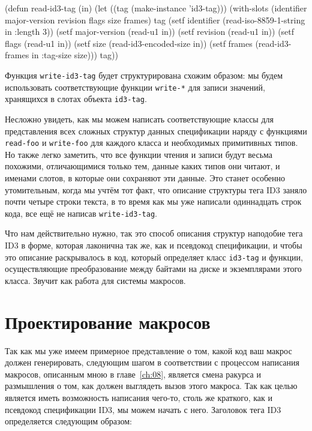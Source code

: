\begin{myverb}
(defun read-id3-tag (in)
  (let ((tag (make-instance 'id3-tag)))
    (with-slots (identifier major-version revision flags size frames) tag
      (setf identifier    (read-iso-8859-1-string in :length 3))
      (setf major-version (read-u1 in))
      (setf revision      (read-u1 in))
      (setf flags         (read-u1 in))
      (setf size          (read-id3-encoded-size in))
      (setf frames        (read-id3-frames in :tag-size size)))
    tag))
\end{myverb}

Функция \lstinline{write-id3-tag} будет структурирована схожим образом: мы будем использовать
соответствующие функции \lstinline{write-*} для записи значений, хранящихся в слотах объекта
\lstinline{id3-tag}.

Несложно увидеть, как мы можем написать соответствующие классы для представления всех
сложных структур данных спецификации наряду с функциями \lstinline{read-foo} и \lstinline{write-foo}
для каждого класса и необходимых примитивных типов. Но также легко заметить, что все
функции чтения и записи будут весьма похожими, отличающимися только тем, данные каких
типов они читают, и именами слотов, в которые они сохраняют эти данные. Это станет
особенно утомительным, когда мы учтём тот факт, что описание структуры тега ID3 заняло
почти четыре строки текста, в то время как мы уже написали одиннадцать строк кода, все ещё
не написав \lstinline{write-id3-tag}.

Что нам действительно нужно, так это способ описания структур наподобие тега ID3 в форме,
которая лаконична так же, как и псевдокод спецификации, и чтобы это описание раскрывалось
в код, который определяет класс \lstinline{id3-tag} и функции, осуществляющие преобразование
между байтами на диске и экземплярами этого класса. Звучит как работа для системы
макросов.

\section{Проектирование макросов}

Так как мы уже имеем примерное представление о том, какой код ваш макрос должен
генерировать, следующим шагом в соответствии с процессом написания макросов, описанным
мною в главе~\ref{ch:08}, является смена ракурса и размышления о том, как должен выглядеть
вызов этого макроса. Так как целью является иметь возможность написания чего-то, столь же
краткого, как и псевдокод спецификации ID3, мы можем начать с него. Заголовок тега ID3
определяется следующим образом:

